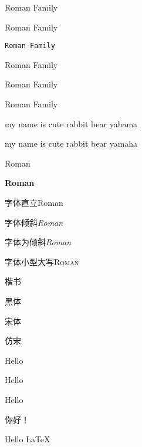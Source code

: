 \documentclass[60pt]{article}
\begin{document}
    \textrm{Roman Family}

    \textsf{Roman Family}

    \texttt{Roman Family}

    \rmfamily Roman Family

    {\sffamily Roman Family}

    \ttfamily Roman Family

    \sffamily my name is cute rabbit bear yahama

    \rmfamily my name is cute rabbit bear yamaha

    \textmd{Roman}

    \textbf{Roman}


    字体直立\textup{Roman}

    字体倾斜\textit{Roman}

    字体为倾斜\textsl{Roman}

    字体小型大写\quad\textsc{Roman}

    \kaishu 楷书

    \heiti 黑体

    \songti 宋体

    {\fangsong 仿宋}

    {\normalsize Hello}

    {\tiny Hello}

    {\large Hello}

    { 你好！}

    Hello \LaTeX
\end{document}

